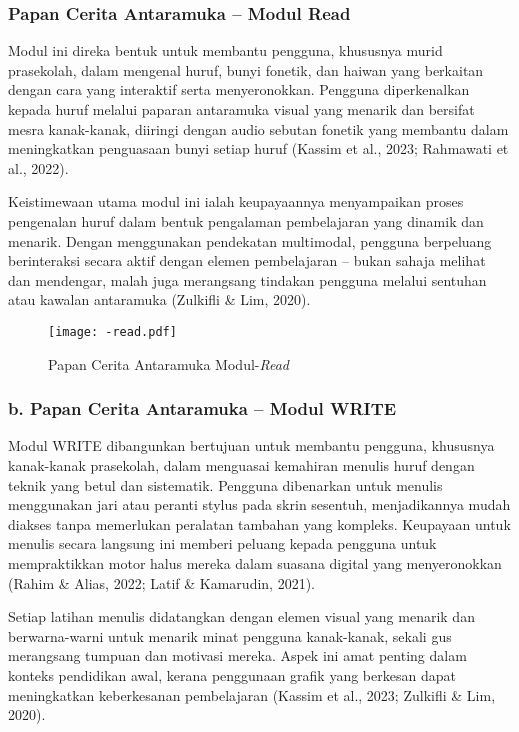 \subsubsection{Papan Cerita Antaramuka – Modul Read}

Modul ini direka bentuk untuk membantu pengguna, khususnya murid prasekolah, dalam mengenal huruf, bunyi fonetik, dan haiwan yang berkaitan dengan cara yang interaktif serta menyeronokkan. Pengguna diperkenalkan kepada huruf melalui paparan antaramuka visual yang menarik dan bersifat mesra kanak-kanak, diiringi dengan audio sebutan fonetik yang membantu dalam meningkatkan penguasaan bunyi setiap huruf (Kassim et al., 2023; Rahmawati et al., 2022).


Keistimewaan utama modul ini ialah keupayaannya menyampaikan proses pengenalan huruf dalam bentuk pengalaman pembelajaran yang dinamik dan menarik. Dengan menggunakan pendekatan multimodal, pengguna berpeluang berinteraksi secara aktif dengan elemen pembelajaran – bukan sahaja melihat dan mendengar, malah juga merangsang tindakan pengguna melalui sentuhan atau kawalan antaramuka (Zulkifli \& Lim, 2020).




 \begin{figure}[h]
        \centering
        \texttt{[image: -read.pdf]}
        \caption{Papan Cerita Antaramuka Modul-\textit{Read}}
    \label{fig:AntaramukaModulWrite}
\end{figure}
\subsubsection{b. Papan Cerita Antaramuka – Modul WRITE}

Modul WRITE dibangunkan bertujuan untuk membantu pengguna, khususnya kanak-kanak prasekolah, dalam menguasai kemahiran menulis huruf dengan teknik yang betul dan sistematik. Pengguna dibenarkan untuk menulis menggunakan jari atau peranti stylus pada skrin sesentuh, menjadikannya mudah diakses tanpa memerlukan peralatan tambahan yang kompleks. Keupayaan untuk menulis secara langsung ini memberi peluang kepada pengguna untuk mempraktikkan motor halus mereka dalam suasana digital yang menyeronokkan (Rahim \& Alias, 2022; Latif \& Kamarudin, 2021).

Setiap latihan menulis didatangkan dengan elemen visual yang menarik dan berwarna-warni untuk menarik minat pengguna kanak-kanak, sekali gus merangsang tumpuan dan motivasi mereka. Aspek ini amat penting dalam konteks pendidikan awal, kerana penggunaan grafik yang berkesan dapat meningkatkan keberkesanan pembelajaran (Kassim et al., 2023; Zulkifli \& Lim, 2020).


